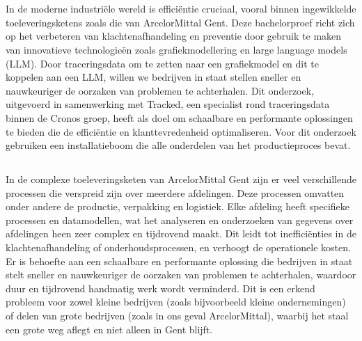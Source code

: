 
\chapter{}%
\label{ch:inleiding}

In de moderne industriële wereld is efficiëntie cruciaal, vooral binnen ingewikkelde toeleveringsketens zoals die van ArcelorMittal Gent. 
Deze bachelorproef richt zich op het verbeteren van klachtenafhandeling en preventie door gebruik te maken van innovatieve technologieën zoals grafiekmodellering en large language models (LLM). 
Door traceringsdata om te zetten naar een grafiekmodel en dit te koppelen aan een LLM, willen we bedrijven in staat stellen sneller en nauwkeuriger de oorzaken van problemen te achterhalen. 
Dit onderzoek, uitgevoerd in samenwerking met Tracked, een specialist rond traceringsdata binnen de Cronos groep, heeft als doel om schaalbare en performante oplossingen te bieden die de efficiëntie en klanttevredenheid optimaliseren.
Voor dit onderzoek gebruiken een installatieboom die alle onderdelen van het productieproces bevat.

\section{}%
\label{sec:probleemstelling}

In de complexe toeleveringsketen van ArcelorMittal Gent zijn er veel verschillende processen die verspreid zijn over meerdere afdelingen. 
Deze processen omvatten onder andere de productie, verpakking en logistiek.
Elke afdeling heeft specifieke processen en datamodellen, wat het analyseren en onderzoeken van gegevens over afdelingen heen zeer complex en tijdrovend maakt. 
Dit leidt tot inefficiënties in de klachtenafhandeling of onderhoudsprocessen, en verhoogt de operationele kosten. 
Er is behoefte aan een schaalbare en performante oplossing die bedrijven in staat stelt sneller en nauwkeuriger de oorzaken van problemen te achterhalen, waardoor duur en tijdrovend handmatig werk wordt verminderd.
Dit is een erkend probleem voor zowel kleine bedrijven (zoals bijvoorbeeld kleine ondernemingen) of delen van grote bedrijven (zoals in ons geval ArcelorMittal), waarbij het staal een grote weg aflegt en niet alleen in Gent blijft.

